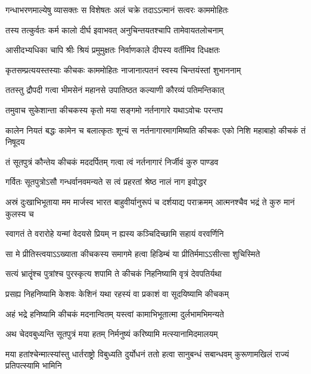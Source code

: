 \twolineshloka
{गन्धाभरणमाल्येषु व्यासक्तः स विशेषतः}
{अलं चक्रे तदाऽऽत्मानं सत्वरः काममोहितः}


\twolineshloka
{तस्य तत्कुर्वतः कर्म कालो दीर्घ इवाभवत्}
{अनुचिन्तयतश्चापि तामेवायतलोचनाम्}


\twolineshloka
{आसीदभ्यधिका चापि श्रीः श्रियं प्रमुमुक्षतः}
{निर्वाणकाले दीपस्य वर्तीमिव दिधक्षतः}


\twolineshloka
{कृतसम्प्रत्ययस्तस्याः कीचकः काममोहितः}
{नाजानात्पतनं स्वस्य चिन्तयंस्तां शुभाननाम्}


\twolineshloka
{ततस्तु द्रौपदी गत्वा भीमसेनं महानसे}
{उपातिष्ठत कल्याणी कौरव्यं पतिमन्तिकात्}


\twolineshloka
{तमुवाच सुकेशान्ता कीचकस्य कृतो मया}
{सङ्गमो नर्तनागारे यथाऽवोचः परन्तप}


\threelineshloka
{कालेन नियतं बद्धः कामेन च बलात्कृतः}
{शून्यं स नर्तनागारमागमिष्यति कीचकः}
{एको निशि महाबाहो कीचकं तं निषूदय}


\twolineshloka
{तं सूतपुत्रं कौन्तेय कीचकं मददर्पितम्}
{गत्वा त्वं नर्तनागारं निर्जीवं कुरु पाण्डव}


\twolineshloka
{गर्वितः सूतपुत्रोऽसौ गन्धर्वानवमन्यते}
{स त्वं प्रहरतां श्रेष्ठ नालं नाग इवोद्धर}


\threelineshloka
{अस्रं दुःखाभिभूताया मम मार्जस्व भारत}
{बाहुवीर्यानुरूपं च दर्शयाद्य पराक्रमम्}
{आत्मनश्चैव भद्रं ते कुरु मानं कुलस्य च}




\twolineshloka
{स्वागतं ते वरारोहे यन्मां वेदयसे प्रियम्}
{न ह्यस्य कञ्चिदिच्छामि सहायं वरवर्णिनि}


\twolineshloka
{सा मे प्रीतिस्त्वयाऽऽख्याता कीचकस्य समागमे}
{हत्वा हिडिम्बं या प्रीतिर्ममाऽऽसीत्सा शुचिस्मिते}


\twolineshloka
{सत्यं भ्रातॄंश्च पुत्रांश्च पुरस्कृत्य शपामि ते}
{कीचकं निहनिष्यामि वृत्रं देवपतिर्यथा}


\twolineshloka
{प्रसह्य निहनिष्यामि केशवः केशिनं यथा}
{रहस्यं वा प्रकाशं वा सूदयिष्यामि कीचकम्}


\twolineshloka
{अहं भद्रे हनिष्यामि कीचकं मदनान्वितम्}
{यस्त्वां कामाभिभूतात्मा दुर्लभामभिमन्यते}


\twolineshloka
{अथ चेदवबुध्यन्ति सूतपुत्रं मया हतम्}
{निर्मनुष्यं करिष्यामि मत्स्यानामिदमालयम्}


\threelineshloka
{मया हतांश्चेन्मात्स्यांस्तु धार्तराष्ट्रो विबुध्यति}
{दुर्योधनं ततो हत्वा सानुबन्धं सबान्धवम्}
{कुरूणामखिलं राज्यं प्रतिपत्स्यामि भामिनि}


